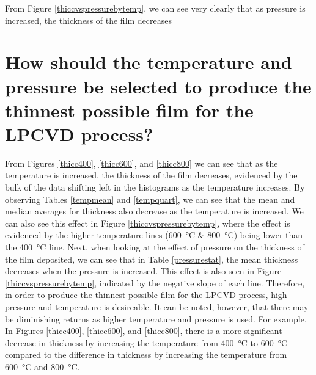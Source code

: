 \documentclass[letterpaper]{article}
\begin{document}
From Figure \ref{thiccvspressurebytemp}, we can see very clearly that as pressure
is increased, the thickness of the film decreases

\section{How should the temperature and pressure be selected to produce the thinnest possible film for the LPCVD process?}

From Figures \ref{thicc400}, \ref{thicc600}, and \ref{thicc800} we can see that
as the temperature is increased, the thickness of the film decreases, evidenced
by the bulk of the data shifting left in the histograms as the temperature
increases. By observing Tables \ref{tempmean} and \ref{tempquart}, we can see
that the mean and median averages for thickness also decrease as the temperature
is increased. We can also see this effect in Figure \ref{thiccvspressurebytemp},
where the effect is evidenced by the higher temperature lines
(\SI{600}{\celsius} \& \SI{800}{\celsius}) being lower than the
\SI{400}{\celsius} line. Next, when looking at the effect of pressure on the
thickness of the film deposited, we can see that in Table \ref{pressurestat},
the mean thickness decreases when the pressure is increased. This effect is also
seen in Figure \ref{thiccvspressurebytemp}, indicated by the negative slope of
each line. Therefore, in order to produce the thinnest possible film for the
LPCVD process, high pressure and temperature is desireable. It can be noted,
however, that there may be diminishing returns as higher temperature and
pressure is used. For example, In Figures \ref{thicc400}, \ref{thicc600}, and
\ref{thicc800}, there is a more significant decrease in thickness by increasing
the temperature from \SI{400}{\celsius} to \SI{600}{\celsius} compared to the
difference in thickness by increasing the temperature from \SI{600}{\celsius}
and \SI{800}{\celsius}.
\end{document}
